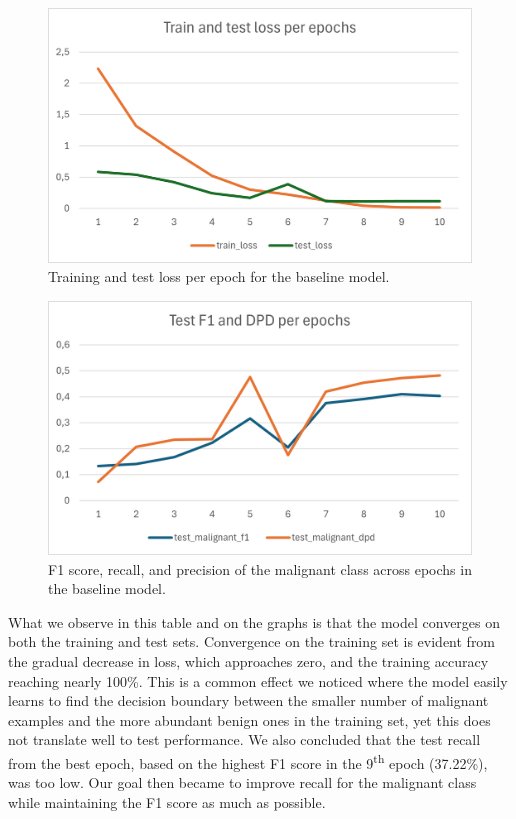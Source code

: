 \vspace{1em}
\begin{figure}[H]
\centering
\includegraphics[width=\linewidth]{figures/results/baseline_experiment_loss_per_epoch.png}
\caption{Training and test loss per epoch for the baseline model.}
\label{fig:baseline-loss}
\end{figure}

\vspace{1em}
\begin{figure}[H]
\centering
\includegraphics[width=\linewidth]{figures/results/baseline_experiment_metricsper_epoch.png}
\caption{F1 score, recall, and precision of the malignant class across epochs in the baseline model.}
\label{fig:baseline-metrics}
\end{figure}


What we observe in this table and on the graphs is that the model converges on both the training and test sets. Convergence on the training set is evident from the gradual decrease in loss, which approaches zero, and the training accuracy reaching nearly 100\%. This is a common effect we noticed where the model easily learns to find the decision boundary between the smaller number of malignant examples and the more abundant benign ones in the training set, yet this does not translate well to test performance. We also concluded that the test recall from the best epoch, based on the highest F1 score in the 9\textsuperscript{th} epoch (37.22\%), was too low. Our goal then became to improve recall for the malignant class while maintaining the F1 score as much as possible.

